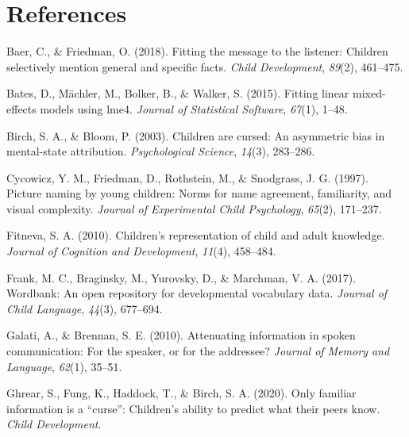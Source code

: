 \documentclass[10pt, letterpaper]{article}
\begin{document}
\vspace{1em} 

\hypertarget{references}{%
\section{References}\label{references}}

\setlength{\parindent}{-0.1in} 
\setlength{\leftskip}{0.125in}

\noindent

\hypertarget{refs}{}
\leavevmode\hypertarget{ref-baer2018}{}%
Baer, C., \& Friedman, O. (2018). Fitting the message to the listener:
Children selectively mention general and specific facts. \emph{Child
Development}, \emph{89}(2), 461--475.

\leavevmode\hypertarget{ref-bates2015}{}%
Bates, D., Mächler, M., Bolker, B., \& Walker, S. (2015). Fitting linear
mixed-effects models using lme4. \emph{Journal of Statistical Software},
\emph{67}(1), 1--48.

\leavevmode\hypertarget{ref-birch2003}{}%
Birch, S. A., \& Bloom, P. (2003). Children are cursed: An asymmetric
bias in mental-state attribution. \emph{Psychological Science},
\emph{14}(3), 283--286.

\leavevmode\hypertarget{ref-cycowicz1997}{}%
Cycowicz, Y. M., Friedman, D., Rothstein, M., \& Snodgrass, J. G.
(1997). Picture naming by young children: Norms for name agreement,
familiarity, and visual complexity. \emph{Journal of Experimental Child
Psychology}, \emph{65}(2), 171--237.

\leavevmode\hypertarget{ref-fitneva2010}{}%
Fitneva, S. A. (2010). Children's representation of child and adult
knowledge. \emph{Journal of Cognition and Development}, \emph{11}(4),
458--484.

\leavevmode\hypertarget{ref-frank2017}{}%
Frank, M. C., Braginsky, M., Yurovsky, D., \& Marchman, V. A. (2017).
Wordbank: An open repository for developmental vocabulary data.
\emph{Journal of Child Language}, \emph{44}(3), 677--694.

\leavevmode\hypertarget{ref-galati2010}{}%
Galati, A., \& Brennan, S. E. (2010). Attenuating information in spoken
communication: For the speaker, or for the addressee? \emph{Journal of
Memory and Language}, \emph{62}(1), 35--51.

\leavevmode\hypertarget{ref-ghrear2020}{}%
Ghrear, S., Fung, K., Haddock, T., \& Birch, S. A. (2020). Only familiar
information is a ``curse'': Children's ability to predict what their
peers know. \emph{Child Development}.
\end{document}
